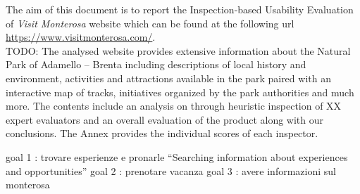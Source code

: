 The aim of this document is to report the Inspection-based Usability Evaluation of \emph{Visit Monterosa} website which can be found at the following url \url{https://www.visitmonterosa.com/}. \\ TODO: The analysed website provides extensive
information about the Natural Park of Adamello – Brenta including descriptions of local history
and environment, activities and attractions available in the park paired with an interactive map of
tracks, initiatives organized by the park authorities and much more. The contents include an
analysis on through heuristic inspection of XX expert evaluators and an overall evaluation of the
product along with our conclusions. The Annex provides the individual scores of each inspector.


goal 1 : trovare esperienze e pronarle   “Searching information about experiences and opportunities”
goal 2 : prenotare vacanza 
goal 3 : avere informazioni sul monterosa